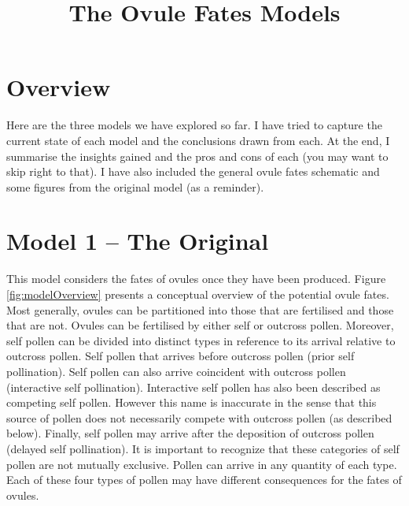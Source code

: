 \documentclass[12pt]{amsart}
\title{The Ovule Fates Models}
\begin{document}
\maketitle

\section{Overview}
Here are the three models we have explored so far. I have tried to capture the current state of each model and the conclusions drawn from each. At the end, I summarise the insights gained and the pros and cons of each (you may want to skip right to that). I have also included the general ovule fates schematic and some figures from the original model (as a reminder).

\section{Model 1 -- The Original}
This model considers the fates of ovules once they have been produced. Figure \ref{fig:modelOverview} presents a conceptual overview of the potential ovule fates. Most generally, ovules can be partitioned into those that are fertilised and those that are not. Ovules can be fertilised by either self or outcross pollen. Moreover, self pollen can be divided into distinct types in reference to its arrival relative to outcross pollen. Self pollen that arrives before outcross pollen (prior self pollination). Self pollen can also arrive coincident with outcross pollen (interactive self pollination). Interactive self pollen has also been described as competing self pollen. However this name is inaccurate in the sense that this source of pollen does not necessarily compete with outcross pollen (as described below). Finally, self pollen may arrive after the deposition of outcross pollen (delayed self pollination). It is important to recognize that these categories of self pollen are not mutually exclusive. Pollen can arrive in any quantity of each type. Each of these four types of pollen may have different consequences for the fates of ovules.
\end{document}
